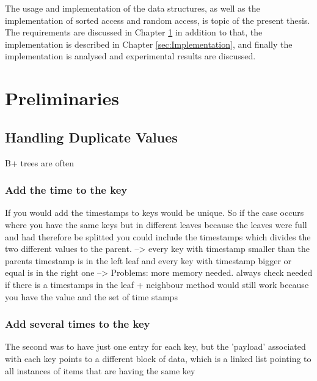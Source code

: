 \documentclass[abstracton,12pt]{scrreprt}
\begin{document}
\newpage
The usage and implementation of the data structures, as well as the implementation of sorted access and random access, is topic of the present thesis. The requirements are discussed in Chapter \ref{sec:P} in addition to that, the implementation is described in Chapter \ref{sec:Implementation}, and finally the implementation is analysed and experimental results are discussed.  




\chapter{Preliminaries}
\label{sec:P}


\section{Handling Duplicate Values}

B+ trees are often 

\subsection{Add the time to the key}
If you would add the timestamps to keys would be unique. So if the case occurs where you have the same keys but in different leaves because the leaves were full and had therefore be splitted you could include the timestamps which divides the two different values to the parent. --> every key with timestamp smaller than the parents timestamp is in the left leaf and every key with timestamp bigger or equal is in the right one --> 
Problems: more memory needed. always check needed if there is a timestamps in the leaf
+ neighbour method would still work because you have the value and the set of time stamps 

\subsection{Add several times to the key}

The second was to have just one entry for each key, but the 'payload' associated with each key points to a different block of data, which is a linked list pointing to all instances of items that are having the same key
\end{document}
